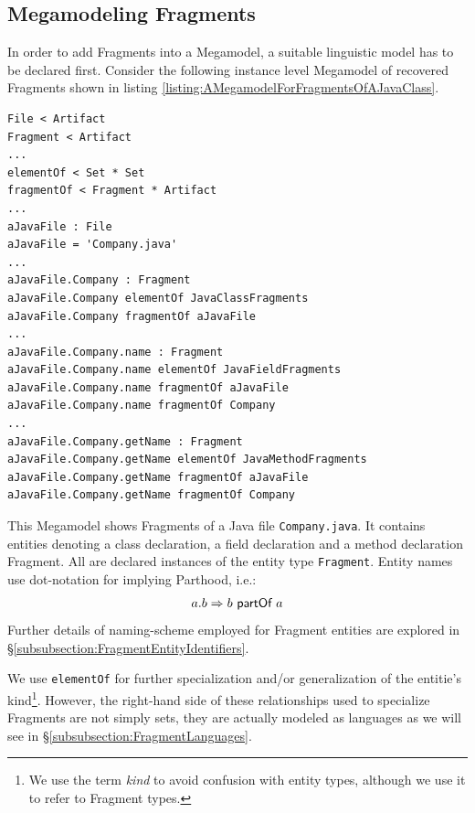 \subsection{Megamodeling Fragments}
\label{subsection:MegamodelingFragments}
In order to add \glspl{Fragment} into a \gls{Megamodel}, a suitable linguistic model has to be declared first. 
Consider the following instance level \gls{Megamodel} of recovered \glspl{Fragment} shown in listing \ref{listing:AMegamodelForFragmentsOfAJavaClass}.
\begin{lstlisting}[caption={A Megamodel for fragments of a Java class},label={listing:AMegamodelForFragmentsOfAJavaClass}]
File < Artifact
Fragment < Artifact
...
elementOf < Set * Set
fragmentOf < Fragment * Artifact
...
aJavaFile : File
aJavaFile = 'Company.java'
...
aJavaFile.Company : Fragment
aJavaFile.Company elementOf JavaClassFragments
aJavaFile.Company fragmentOf aJavaFile
...
aJavaFile.Company.name : Fragment
aJavaFile.Company.name elementOf JavaFieldFragments
aJavaFile.Company.name fragmentOf aJavaFile
aJavaFile.Company.name fragmentOf Company
...
aJavaFile.Company.getName : Fragment
aJavaFile.Company.getName elementOf JavaMethodFragments
aJavaFile.Company.getName fragmentOf aJavaFile
aJavaFile.Company.getName fragmentOf Company
\end{lstlisting}
This \gls{Megamodel} shows \glspl{Fragment} of a \gls{Java} file \texttt{Company.java}.
It contains entities denoting a class declaration, a field declaration and a method declaration \gls{Fragment}.
All are declared instances of the entity type \texttt{Fragment}.
Entity names use dot-notation for implying \gls{Parthood}, i.e.:
\begin{align*}
a.b \Rightarrow b ~ \textsf{partOf} ~ a
\end{align*}
Further details of naming-scheme employed for \gls{Fragment} entities are explored in §\ref{subsubsection:FragmentEntityIdentifiers}.

We use \texttt{elementOf} for further specialization and/or generalization of the entitie's kind\footnote{We use the term \textit{kind} to avoid confusion with entity types, although we use it to refer to \gls{Fragment} types.}.
However, the right-hand side of these relationships used to specialize \glspl{Fragment} are not simply sets, they are actually modeled as languages as we will see in §\ref{subsubsection:FragmentLanguages}.

